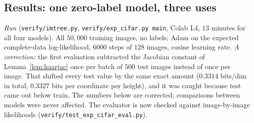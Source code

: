 \documentclass[11pt]{article}
\theoremstyle{definition}
\begin{document}
\subsection{Results: one zero-label model, three uses}\label{sec:cifar-res}
\emph{Run} (\texttt{verify/imtree.py}, \texttt{verify/exp\_cifar.py main}, Colab L4, $13$ minutes for all four
models). All $50{,}000$ training images, no labels; Adam on the expected complete-data log-likelihood, $6000$
steps of $128$ images, cosine learning rate. \emph{A correction:} the first evaluation subtracted the Jacobian
constant of Lemma~\ref{lem:haarjac} once per batch of $500$ test images instead of once per image. That shifted
every test value by the same exact amount ($0.3314$ bits/dim in total, $0.3327$ bits per coordinate per height),
and it was caught because test came out below train. The numbers below are corrected; comparisons between models
were never affected. The evaluator is now checked against image-by-image likelihoods
(\texttt{verify/test\_exp\_cifar\_eval.py}).
\end{document}
